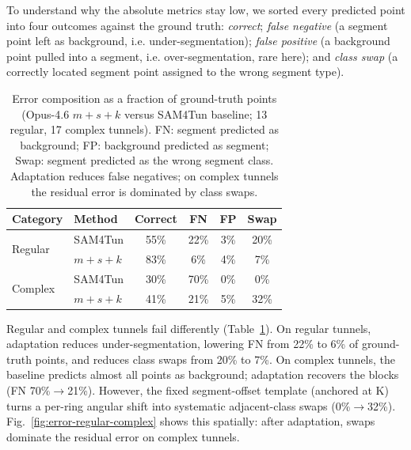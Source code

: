 \documentclass[a4paper,fleqn]{cas-dc}
\begin{document}
{To understand why the absolute metrics stay low, we sorted every predicted point into four outcomes against the ground truth: \textit{correct}; \textit{false negative} (a segment point left as background, i.e. under-segmentation); \textit{false positive} (a background point pulled into a segment, i.e. over-segmentation, rare here); and \textit{class swap} (a correctly located segment point assigned to the wrong segment type).

\begin{table}[ht]
\caption{Error composition as a fraction of ground-truth points (Opus-4.6 \mbox{$m+s+k$} versus SAM4Tun baseline; 13 regular, 17 complex tunnels). FN: segment predicted as background; FP: background predicted as segment; Swap: segment predicted as the wrong segment class. Adaptation reduces false negatives; on complex tunnels the residual error is dominated by class swaps.}\label{tab:error-composition}
\begin{tabular*}{\tblwidth}{@{} l l c c c c @{}}
\toprule
Category & Method & Correct & FN & FP & Swap \\
\midrule
\multirow{2}{*}{Regular}
  & SAM4Tun       & 55\% & 22\% & 3\% & 20\% \\
  & \mbox{$m+s+k$} & 83\% & 6\%  & 4\% & 7\%  \\
\midrule
\multirow{2}{*}{Complex}
  & SAM4Tun       & 30\% & 70\% & 0\% & 0\%  \\
  & \mbox{$m+s+k$} & 41\% & 21\%  & 5\% & 32\% \\
\bottomrule
\end{tabular*}
\end{table}

Regular and complex tunnels fail differently (Table~\ref{tab:error-composition}). On regular tunnels, adaptation reduces under-segmentation, lowering FN from 22\% to 6\% of ground-truth points, and reduces class swaps from 20\% to 7\%. On complex tunnels, the baseline predicts almost all points as background; adaptation recovers the blocks (FN 70\%$\rightarrow$21\%). However, the fixed segment-offset template (anchored at K) turns a per-ring angular shift into systematic adjacent-class swaps (0\%$\rightarrow$32\%). Fig.~\ref{fig:error-regular-complex} shows this spatially: after adaptation, swaps dominate the residual error on complex tunnels.

}
\end{document}

